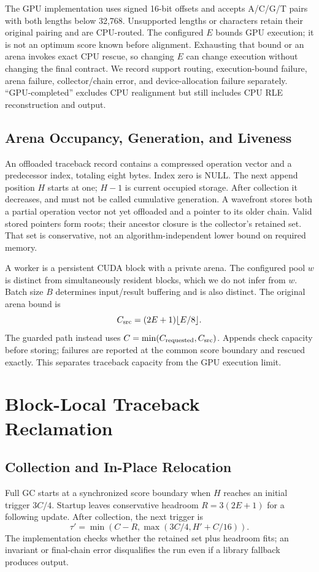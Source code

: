\documentclass[conference,a4paper]{IEEEtran}
\begin{document}
The GPU implementation uses signed 16-bit offsets and accepts A/C/G/T pairs with both lengths below 32,768. Unsupported lengths or characters retain their original pairing and are CPU-routed. The configured $E$ bounds GPU execution; it is not an optimum score known before alignment. Exhausting that bound or an arena invokes exact CPU rescue, so changing $E$ can change execution without changing the final contract. We record support routing, execution-bound failure, arena failure, collector/chain error, and device-allocation failure separately. ``GPU-completed'' excludes CPU realignment but still includes CPU RLE reconstruction and output.

\subsection{Arena Occupancy, Generation, and Liveness}
An offloaded traceback record contains a compressed operation vector and a predecessor index, totaling eight bytes. Index zero is NULL. The next append position $H$ starts at one; $H-1$ is current occupied storage. After collection it decreases, and must not be called cumulative generation. A wavefront stores both a partial operation vector not yet offloaded and a pointer to its older chain. Valid stored pointers form roots; their ancestor closure is the collector's retained set. That set is conservative, not an algorithm-independent lower bound on required memory.

A worker is a persistent CUDA block with a private arena. The configured pool $w$ is distinct from simultaneously resident blocks, which we do not infer from $w$. Batch size $B$ determines input/result buffering and is also distinct. The original arena bound is
\begin{equation} C_{\rm src}=(2E+1)\lfloor E/8\rfloor.\label{eq:bound}\end{equation}
The guarded path instead uses $C=\min(C_{\rm requested},C_{\rm src})$. Appends check capacity before storing; failures are reported at the common score boundary and rescued exactly. This separates traceback capacity from the GPU execution limit.

\section{Block-Local Traceback Reclamation}
\subsection{Collection and In-Place Relocation}
Full GC starts at a synchronized score boundary when $H$ reaches an initial trigger $3C/4$. Startup leaves conservative headroom $R=3(2E+1)$ for a following update. After collection, the next trigger is
\begin{equation}\tau' = \min(C-R,\max(3C/4,H'+C/16)).\end{equation}
The implementation checks whether the retained set plus headroom fits; an invariant or final-chain error disqualifies the run even if a library fallback produces output.
\end{document}
